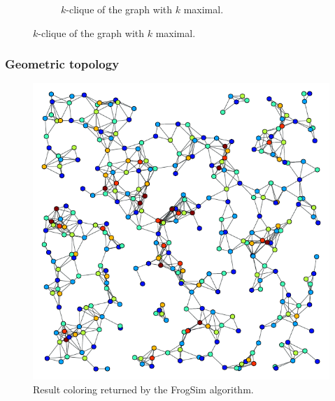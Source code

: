 \documentclass{beamer}
\begin{document}
\begin{frame}
\begin{figure}[t]
\begin{subfigure}[h]{0.4\textwidth}
		\caption{\footnotesize{$k$-clique of the graph with $k$ maximal.}}\label{fig:CliqueColoration}
	\end{subfigure}
\end{figure}
\end{frame}

\begin{frame}
\frametitle{Geometric topology}
\begin{figure}[b]
	\centering
	\includegraphics[height=0.65\textheight]{Figure/geo-coloried.pdf}
	\caption{Result coloring returned by the FrogSim algorithm.}\label{fig:GeoColoration}
\end{figure}
\end{frame}
\end{document}
